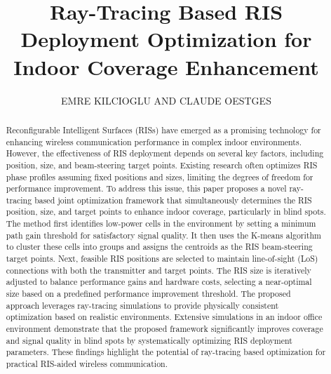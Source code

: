 \documentclass{IEEEoj}
\begin{document}

\title{Ray-Tracing Based RIS Deployment Optimization for Indoor Coverage Enhancement}

\author{EMRE KILCIOGLU AND CLAUDE OESTGES}

\begin{abstract}
Reconfigurable Intelligent Surfaces (RISs) have emerged as a promising technology for enhancing wireless communication performance in complex indoor environments. However, the effectiveness of RIS deployment depends on several key factors, including position, size, and beam-steering target points. Existing research often optimizes RIS phase profiles assuming fixed positions and sizes, limiting the degrees of freedom for performance improvement. To address this issue, this paper proposes a novel ray-tracing based joint optimization framework that simultaneously determines the RIS position, size, and target points to enhance indoor coverage, particularly in blind spots. The method first identifies low-power cells in the environment by setting a minimum path gain threshold for satisfactory signal quality. It then uses the K-means algorithm to cluster these cells into groups and assigns the centroids as the RIS beam-steering target points. Next, feasible RIS positions are selected to maintain line-of-sight (LoS) connections with both the transmitter and target points. The RIS size is iteratively adjusted to balance performance gains and hardware costs, selecting a near-optimal size based on a predefined performance improvement threshold. The proposed approach leverages ray-tracing simulations to provide physically consistent optimization based on realistic environments. Extensive simulations in an indoor office environment demonstrate that the proposed framework significantly improves coverage and signal quality in blind spots by systematically optimizing RIS deployment parameters. These findings highlight the potential of ray-tracing based optimization for practical RIS-aided wireless communication.
\end{abstract}
\end{document}
